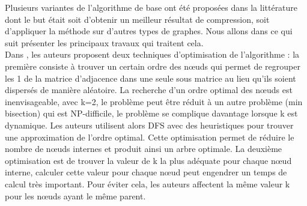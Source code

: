 Plusieurs variantes de l'algorithme de base ont été proposées dans la littérature dont le but était soit d'obtenir un meilleur résultat de compression, soit d'appliquer la méthode sur d'autres types de graphes. Nous allons dans ce qui suit présenter les principaux travaux qui traitent cela.\\

Dans \citep{shi2012optimizing}, les auteurs proposent deux techniques d'optimisation de l'algorithme : la première consiste à trouver un certain ordre des nœuds qui permet de regrouper les 1 de la matrice d'adjacence dans une seule sous matrice au lieu qu'ils soient dispersés de manière aléatoire. La recherche d'un ordre optimal des nœuds est inenvisageable, avec k=2, le problème peut être réduit à un autre problème (min bisection) qui est NP-difficile, le problème se complique davantage lorsque k est dynamique. Les auteurs utilisent alors DFS avec des heuristiques pour trouver une approximation de l'ordre optimal. Cette optimisation permet de réduire le nombre de nœuds internes et produit ainsi un arbre optimale. La deuxième optimisation est de trouver la valeur de k la plus adéquate pour chaque nœud interne, calculer cette valeur pour chaque nœud peut engendrer un temps de calcul très important. Pour éviter cela, les auteurs affectent la même valeur k pour les nœuds ayant le même parent. 	

